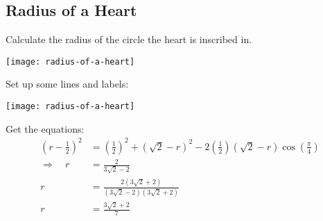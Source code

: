 \documentclass[12pt]{article}
\begin{document}
\subsection*{Radius of a Heart}
Calculate the radius of the circle the heart is inscribed in.
\begin{center}
\centering
\texttt{[image: radius-of-a-heart]}
\end{center}

\begin{answer}
Set up some lines and labels:
\begin{center}
\centering
\texttt{[image: radius-of-a-heart]}
\end{center}
Get the equations:
\begin{align*}
\left(r-\frac{1}{2}\right)^2 
  & = \left(\frac{1}{2}\right)^2
    + \left(\sqrt{2}-r\right)^2
    - 2 \left(\frac{1}{2}\right) (\sqrt{2}-r) \cos{\left(\frac{\pi}{4}\right)} \\
\Rightarrow \quad 
r & = \frac{2}{3\sqrt{2}-2} \\[2ex]
r & = \frac{2(3\sqrt{2}+2)}{(3\sqrt{2}-2)(3\sqrt{2}+2)} \\[2ex]
r & = \frac{3\sqrt{2}+2}{7} 
\end{align*}
\end{answer}
\end{document}
